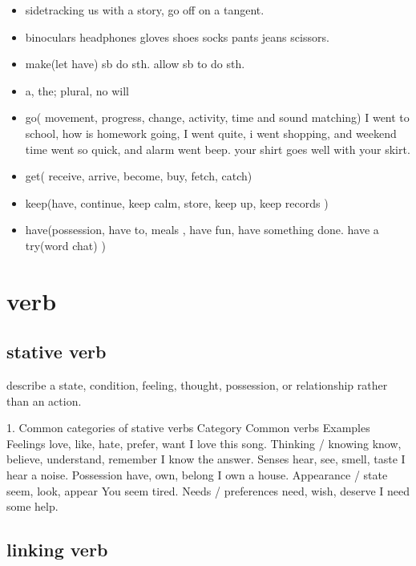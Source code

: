 \documentclass[a4paper,11pt,twoside]{book}
\begin{document}
\begin{itemize}
	\item sidetracking us with a story, go off on a tangent. 
	
	\item binoculars headphones gloves shoes socks pants jeans scissors.
	
	\item make(let have) sb do sth. allow sb to do sth. 
	
	\item a, the;   plural,  no will
	
	\item go( movement, progress, change, activity, time and sound matching)
	I went to school, how is homework going, I went quite, i went shopping, and weekend time went so quick, and alarm went beep. your shirt goes well with your skirt. 
	
	\item get( receive, arrive, become, buy, fetch, catch)
	
	\item keep(have, continue, keep calm, store, keep up, keep records )
	
	\item have(possession, have to, meals , have fun, have something done. have a try(word chat) )
			
\end{itemize}

\section{verb}
\subsection{stative verb}
\par describe a state, condition, feeling, thought, possession, or relationship rather than an action.

1. Common categories of stative verbs
Category	Common verbs	Examples
Feelings	love, like, hate, prefer, want      	           I love this song.
Thinking / knowing	know, believe, understand, remember	     I know the answer.
Senses	hear, see, smell, taste	                             I hear a noise.
Possession	have, own, belong	                         I own a house.
Appearance / state	seem, look, appear	                You seem tired.
Needs / preferences	need, wish, deserve	                               I need some help.

\subsection{linking verb}
\end{document}
